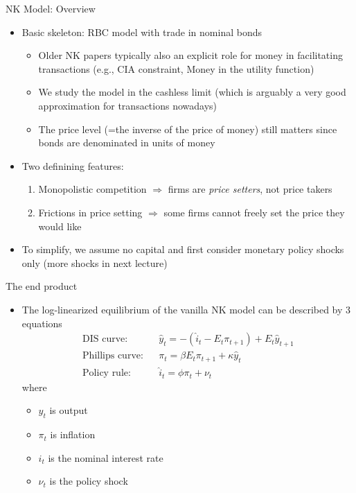 \documentclass[9pt,xcolor={dvipsnames}]{beamer}
\newcommand{\bit}{\begin{itemize}}
\newcommand{\eit}{\end{itemize}}
\newcommand{\ben}{\begin{enumerate}}
\newcommand{\een}{\end{enumerate}}
\newcommand{\bc}{\color{blue}}
\begin{document}
\begin{frame}{NK Model: Overview}

\bit
\setlength\itemsep{1.5em} 

\item Basic skeleton: RBC model with trade in nominal bonds
\bit
\setlength\itemsep{0.5em} 
	\item Older NK papers typically also an explicit role for money in facilitating transactions  (e.g., CIA constraint, Money in the utility function)

	\item We study the model in the {\bc cashless limit} (which is arguably a very good approximation for transactions nowadays)

	\item The price level (=the inverse of the price of money) still matters since bonds are denominated in units of money
\eit


\item Two definining features:
\ben
\setlength\itemsep{0.5em} 
	\item Monopolistic competition $\Rightarrow$ firms are \emph{price setters}, not price takers
	
	\item Frictions in price setting $\Rightarrow$ some firms cannot freely set the price they would like
\een

\item To simplify, we assume no capital and first consider monetary policy shocks only (more shocks in next lecture)

\eit

\end{frame}


\begin{frame}{The end product}

\bit
\setlength\itemsep{1.5em} 

\item The log-linearized equilibrium of the vanilla NK model can be described by 3 equations
\begin{eqnarray}
\text{DIS curve:} && \hat y_t = - (\hat i_t-E_t \pi_{t+1}) + E_t \hat y_{t+1} \nonumber \\
\text{Phillips curve:} && \pi_t = \beta E_t \pi_{t+1} + \kappa \hat y_t \nonumber \\
\text{Policy rule:} && \hat i_t = \phi \pi_t + \nu_t \nonumber 
\end{eqnarray}
where 
\bit
	\item $y_t$ is output
	\item $\pi_t$ is inflation
	\item $i_t$ is the nominal interest rate
	\item $\nu_t$ is the policy shock
\eit

\eit

\end{frame}
\end{document}
